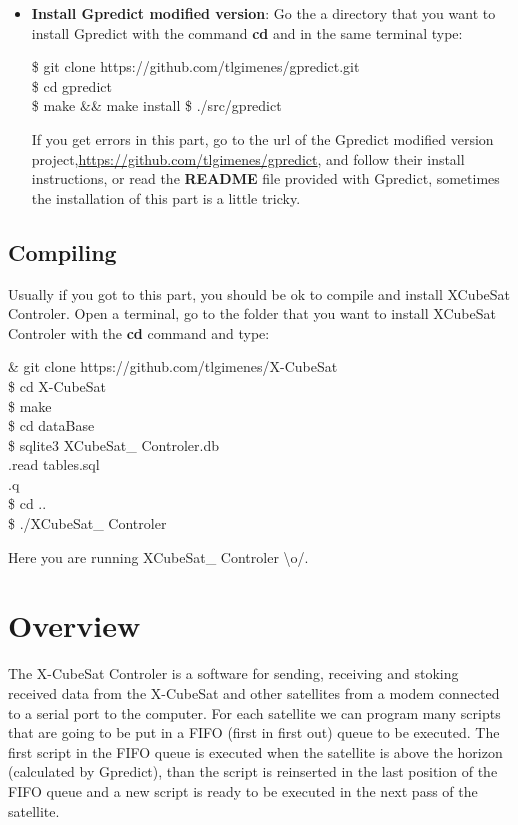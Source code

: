 \documentclass[pdftex,11pt,a4paper,titlepage]{report}
\begin{document}
\begin{itemize}
\item \textbf{Install Gpredict modified version}: Go the a directory that you want to install Gpredict with the command \textbf{cd} and in the same terminal type:
\begin{framed}
\$ git clone https://github.com/tlgimenes/gpredict.git \\
\$ cd gpredict \\
\$ make \&\& make install
\$ ./src/gpredict
\end{framed}
If you get errors in this part, go to the url of the Gpredict modified version project,\url{https://github.com/tlgimenes/gpredict}, and follow their install instructions, or read the \textbf{README} file provided with Gpredict, sometimes the installation of this part is a little tricky. 
\end{itemize}

\section{Compiling}
Usually if you got to this part, you should be ok to compile and install XCubeSat Controler. Open a terminal, go to the folder that you want to install XCubeSat Controler with the \textbf{cd} command and type:

\begin{framed}
\& git clone https://github.com/tlgimenes/X-CubeSat \\
\$ cd X-CubeSat \\
\$ make \\
\$ cd dataBase \\
\$ sqlite3 XCubeSat\_ Controler.db \\
.read tables.sql \\
.q \\
\$ cd .. \\
\$ ./XCubeSat\_ Controler 
\end{framed}

Here you are running XCubeSat\_ Controler \textbackslash o/.

\chapter{Overview}
\hspace{0.4cm} The X-CubeSat Controler is a software for sending, receiving and stoking received data from the X-CubeSat and other satellites from a modem connected to a serial port to the computer. For each satellite we can program many scripts that are going to be put in a FIFO (first in first out) queue to be executed. The first script in the FIFO queue is executed when the satellite is above the horizon (calculated by Gpredict), than the script is reinserted in the last position of the FIFO queue and a new script is ready to be executed in the next pass of the satellite. 
\end{document}
